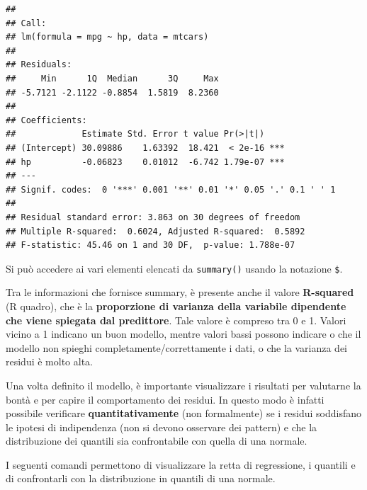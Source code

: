 \documentclass[]{book}
\newenvironment{Shaded}{\begin{snugshade}}{\end{snugshade}}
\newcommand{\CommentTok}[1]{\textcolor[rgb]{0.56,0.35,0.01}{\textit{#1}}}
\newcommand{\DataTypeTok}[1]{\textcolor[rgb]{0.13,0.29,0.53}{#1}}
\newcommand{\DecValTok}[1]{\textcolor[rgb]{0.00,0.00,0.81}{#1}}
\newcommand{\KeywordTok}[1]{\textcolor[rgb]{0.13,0.29,0.53}{\textbf{#1}}}
\newcommand{\NormalTok}[1]{#1}
\newcommand{\OperatorTok}[1]{\textcolor[rgb]{0.81,0.36,0.00}{\textbf{#1}}}
\newcommand{\StringTok}[1]{\textcolor[rgb]{0.31,0.60,0.02}{#1}}
\begin{document}
\begin{verbatim}
## 
## Call:
## lm(formula = mpg ~ hp, data = mtcars)
## 
## Residuals:
##     Min      1Q  Median      3Q     Max 
## -5.7121 -2.1122 -0.8854  1.5819  8.2360 
## 
## Coefficients:
##             Estimate Std. Error t value Pr(>|t|)    
## (Intercept) 30.09886    1.63392  18.421  < 2e-16 ***
## hp          -0.06823    0.01012  -6.742 1.79e-07 ***
## ---
## Signif. codes:  0 '***' 0.001 '**' 0.01 '*' 0.05 '.' 0.1 ' ' 1
## 
## Residual standard error: 3.863 on 30 degrees of freedom
## Multiple R-squared:  0.6024, Adjusted R-squared:  0.5892 
## F-statistic: 45.46 on 1 and 30 DF,  p-value: 1.788e-07
\end{verbatim}

Si può accedere ai vari elementi elencati da \texttt{summary()} usando la notazione \texttt{\$}.

Tra le informazioni che fornisce summary, è presente anche il valore \textbf{R-squared} (R quadro), che è la \textbf{proporzione di varianza della variabile dipendente che viene spiegata dal predittore}. Tale valore è compreso tra 0 e 1. Valori vicino a 1 indicano un buon modello, mentre valori bassi possono indicare o che il modello non spieghi completamente/correttamente i dati, o che la varianza dei residui è molto alta.

Una volta definito il modello, è importante visualizzare i risultati per valutarne la bontà e per capire il comportamento dei residui. In questo modo è infatti possibile verificare \textbf{quantitativamente} (non formalmente) se i residui soddisfano le ipotesi di indipendenza (non si devono osservare dei pattern) e che la distribuzione dei quantili sia confrontabile con quella di una normale.

I seguenti comandi permettono di visualizzare la retta di regressione, i quantili e di confrontarli con la distribuzione in quantili di una normale.

\begin{Shaded}
\end{Shaded}
\end{document}
